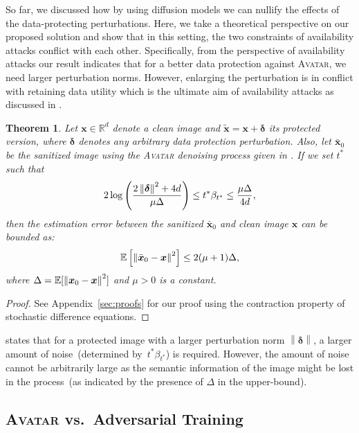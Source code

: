 \documentclass[conference]{IEEEtran}
\newtheorem{theorem}{Theorem}
\theoremstyle{definition}
\theoremstyle{remark}
\theoremstyle{proposition}
\newcommand{\norm}[1]{\left\lVert#1\right\rVert}
\begin{document}
So far, we discussed how by using diffusion models we can nullify the effects of the data-protecting perturbations.
Here, we take a theoretical perspective on our proposed solution and show that in this setting, the two constraints of availability attacks conflict with each other.
Specifically, from the perspective of availability attacks our result indicates that for a better data protection against \textsc{Avatar}, we need larger perturbation norms.
However, enlarging the perturbation is in conflict with retaining data utility which is the ultimate aim of availability attacks as discussed in .

\begin{theorem}\label{thm:convergence}
    Let $\boldsymbol{x} \in \mathbb{R}^{d}$ denote a clean image and ${\tilde{\boldsymbol{x}} = \boldsymbol{x} + \boldsymbol{\delta}}$ its protected version, where ${\boldsymbol{\delta}}$ denotes any arbitrary data protection perturbation.
    Also, let $\bar{\boldsymbol{x}}_{0}$ be the sanitized image using the \textsc{Avatar} denoising process given in .
    If we set $t^{*}$ such that
    $$\small 2\log\left(\frac{2\norm{\boldsymbol{\delta}}^{2} + 4d}{\mu \Delta}\right) \leq t^{*} \beta_{t^{*}} \leq \frac{\mu \Delta}{4d},$$
    then the estimation error between the sanitized $\bar{\boldsymbol{x}}_{0}$ and clean image $\boldsymbol{x}$ can be bounded as:
    $$\small \mathbb{E}\left[\norm{\bar{\boldsymbol{x}}_{0} - \boldsymbol{x}}^2\right] \leq 2(\mu + 1)\Delta,$$
    where $\small \Delta = \mathbb{E}[\norm{\boldsymbol{x}_0 - \boldsymbol{x}}^{2}]$ and $\mu > 0$ is a constant.
\end{theorem}
\begin{proof}
    See Appendix~\ref{sec:proofs} for our proof using the contraction property of stochastic difference equations.
\end{proof}

 states that for a protected image with a larger perturbation norm $\norm{\boldsymbol{\delta}}$, a larger amount of noise~(determined by~$t^{*} \beta_{t^{*}}$) is required.
However, the amount of noise cannot be arbitrarily large as the semantic information of the image might be lost in the process~(as indicated by the presence of $\Delta$ in the upper-bound).

\subsection{\textsc{Avatar} vs.~Adversarial Training}\label{sec:discussion}
\end{document}

